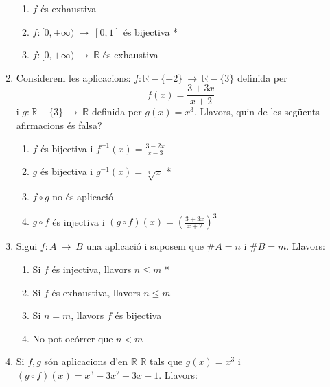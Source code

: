 \begin{enumerate}
\begin{enumerate}
\item $f$ \'{e}s exhaustiva

\item $f:[0,+\infty )~\longrightarrow ~[0,1]$ \'{e}s bijectiva *

\item $f:[0,+\infty)~\longrightarrow~\mathbb{R}$ \'{e}s exhaustiva
\end{enumerate}

\item Considerem les aplicacions: $f:\mathbb{R}-\{-2\}~\longrightarrow ~%
\mathbb{R}-\{3\}$ definida per%
\begin{equation*}
f(x)=\frac{3+3x}{x+2}
\end{equation*}
i $g:\mathbb{R}-\{3\}~\longrightarrow~\mathbb{R}$ definida per $g(x)=x^{3}$.
Llavors, quin de les seg\"{u}ents afirmacions \'{e}s falsa?

\begin{enumerate}
\item $f$ \'{e}s bijectiva i $f^{-1}(x)=\frac{3-2x}{x-3}$

\item $g$ \'{e}s bijectiva i $g^{-1}(x)=\sqrt[3]{x}$ *

\item $f\circ g$ no \'{e}s aplicaci\'{o}

\item $g\circ f$ \'{e}s injectiva i $(g\circ f)(x)=\left( \frac{3+3x}{x+2}%
\right) ^{3}$
\end{enumerate}

\item Sigui $f:A~\longrightarrow~B$ una aplicaci\'{o} i suposem que $\#A=n$
i $\#B=m$. Llavors:

\begin{enumerate}
\item Si $f$ \'{e}s injectiva, llavors $n\leq m$ *

\item Si $f$ \'{e}s exhaustiva, llavors $n\leq m$

\item Si $n=m$, llavors $f$ \'{e}s bijectiva

\item No pot oc\'{o}rrer que $n<m$
\end{enumerate}

\item Si $f,g$ s\'{o}n aplicacions d'en $\mathbb{R}$ $\mathbb{R}$ tals que $%
g(x)=x^{3}$ i $(g\circ f)(x)=x^{3}-3x^{2}+3x-1$. Llavors:


\end{enumerate}
